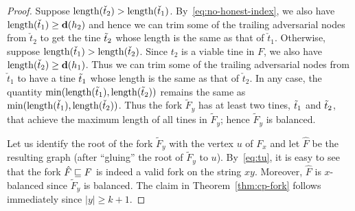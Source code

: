 \begin{proof}
    Suppose $\operatorname{length}(\check{t}_2) > \operatorname{length}(\check{t}_1)$. 
    By~\eqref{eq:no-honest-index}, we also have $\operatorname{length}(\check{t}_1) \geq \mathbf{d}(h_2)$  
    and hence we can trim some of the trailing adversarial nodes from $\check{t}_2$ 
    to get the tine $\tilde{t}_2$ 
    whose length is the same as that of $\check{t}_1$. 
    Otherwise, suppose $\operatorname{length}(\check{t}_1) > \operatorname{length}(\check{t}_2)$. 
    Since $t_2$ is a viable tine in $F$, we also have $\operatorname{length}(\check{t}_2) \geq \mathbf{d}(h_1)$. 
    Thus we can trim some of the trailing adversarial nodes from $\check{t}_1$
    to have a tine $\tilde{t}_1$ 
    whose length is the same as that of $\check{t}_2$. 
    In any case, the quantity $\min(\operatorname{length}(\tilde{t}_1), \operatorname{length}(\tilde{t}_2))$ 
    remains the same as $\min(\operatorname{length}(\check{t}_1), \operatorname{length}(\check{t}_2))$. 
    Thus the fork $\tilde{F}_y$ has at least two tines, $\tilde{t}_1$ and $\tilde{t}_2$, that achieve the maximum length of all tines in $\tilde{F}_y$; hence $\tilde{F}_y$ is balanced.

    
    Let us identify the root of the fork $\tilde{F}_y$ with the vertex $u$ of $F_x$ and 
    let $\hat{F}$ be the resulting graph (after ``gluing'' the root of $\tilde{F}_y$ to $u$). 
    By~\eqref{eq:tu}, it is easy to see that the fork 
    $\hat{F} \sqsubseteq F$ 
    is indeed a valid fork on the string $x y$. 
    Moreover, $\hat{F}$ is $x$-balanced since $\tilde{F}_y$ is balanced. 
    The claim in Theorem~\ref{thm:cp-fork} follows immediately since $|y| \geq k + 1$.
  \end{proof}



